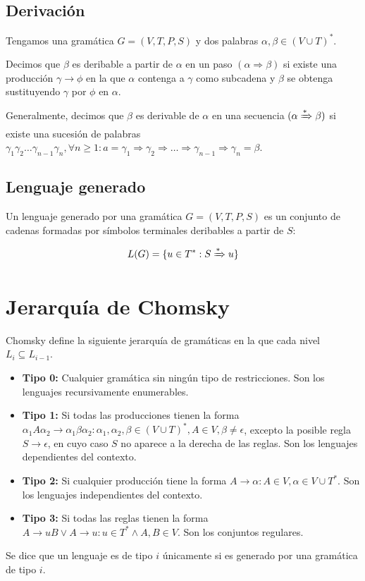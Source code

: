 \subsection{Derivación}

Tengamos una gramática $G = (V, T, P, S)$ y dos palabras $\alpha, \beta \in {(V \cup T)}^*$.

Decimos que $\beta$ es deribable a partir de $\alpha$ en un paso $(\alpha \Rightarrow \beta)$ si existe una producción $\gamma \rightarrow \phi$ en la que $\alpha$ contenga a $\gamma$ como subcadena y $\beta$ se obtenga sustituyendo $\gamma$ por $\phi$ en $\alpha$.

Generalmente, decimos que $\beta$ es derivable de $\alpha$ en una secuencia $(\alpha \xRightarrow{*} \beta)$ si existe una sucesión de palabras $\gamma_1 \gamma_2 \ldots \gamma_{n-1} \gamma_n, \forall n \geq 1 : a = \gamma_1 \Rightarrow \gamma_2 \Rightarrow \ldots \Rightarrow \gamma_{n-1} \Rightarrow \gamma_n = \beta$.

\subsection{Lenguaje generado}

Un lenguaje generado por una gramática $G = (V, T, P, S)$ es un conjunto de cadenas formadas por símbolos terminales deribables a partir de $S$:

\[L(G) = \{u \in T^* : S \xRightarrow{*} u\}\]

\section{Jerarquía de Chomsky}

Chomsky define la siguiente jerarquía de gramáticas en la que cada nivel $L_i \subseteq L_{i-1}$.

\begin{itemize}
	\item\textbf{Tipo 0:} Cualquier gramática sin ningún tipo de restricciones. Son los lenguajes recursivamente enumerables.
	\item\textbf{Tipo 1:} Si todas las producciones tienen la forma $\alpha_1 A \alpha_2 \rightarrow \alpha_1 \beta \alpha_2 : \alpha_1, \alpha_2, \beta \in {(V \cup T)}^*, A \in V, \beta \neq \epsilon$, excepto la posible regla $S \rightarrow \epsilon$, en cuyo caso $S$ no aparece a la derecha de las reglas. Son los lenguajes dependientes del contexto.
	\item\textbf{Tipo 2:} Si cualquier producción tiene la forma $A \rightarrow \alpha : A \in V, \alpha \in {V \cup T}^*$. Son los lenguajes independientes del contexto.
	\item\textbf{Tipo 3:} Si todas las reglas tienen la forma $A \rightarrow uB \lor A \rightarrow u : u \in T^* \land A,B \in V$. Son los conjuntos regulares.
\end{itemize}

Se dice que un lenguaje es de tipo $i$ únicamente si es generado por una gramática de tipo $i$.
